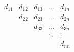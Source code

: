 \documentclass[11pt, english]{article}
\begin{document}
\newcommand{\CC}{C\nolinebreak\hspace{-.05em}\raisebox{.4ex}{\tiny\bf +}\nolinebreak\hspace{-.10em}\raisebox{.4ex}{\tiny\bf +}}
\def\CC{{C\nolinebreak[4]\hspace{-.05em}\raisebox{.4ex}{\tiny\bf ++}}}



\newpage

\[
\begin{matrix}
d_{11} & d_{12} & d_{13} & \dots & d_{1n}\\
  & d_{22} & d_{23} & \dots & d_{2n}\\
  &  & d_{33}       &\dots & d_{3n}\\
  &  &              &\ddots & \vdots\\
  &  &              &       & d_{nn}
\end{matrix}
\]

\tableofcontents
\newpage



\newpage


\newpage



\newpage


\newpage





\newpage



\end{document}
